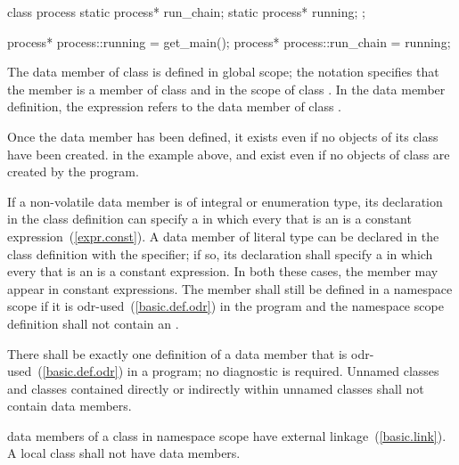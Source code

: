 \begin{codeblock}
class process {
  static process* run_chain;
  static process* running;
};

process* process::running = get_main();
process* process::run_chain = running;
\end{codeblock}

The  data member  of class
 is defined in global scope; the notation
 specifies that the member 
is a member of class  and in the scope of class
. In the  data member definition, the
 expression refers to the  data
member  of class .
\exitexample

\enternote
Once the  data member has been defined, it exists even if
no objects of its class have been created.
\enterexample
in the example above,  and  exist even
if no objects of class  are created by the program.
\exitexample
\exitnote

\pnum
If a non-volatile   data member is
of integral or enumeration type,
its declaration in the class definition can specify a
 in which every
 that is an 
is a constant expression~(\ref{expr.const}). A  data member of
literal type can be declared in the class definition with the
 specifier; if so, its declaration shall specify a
 in which every
 that is an 
is a constant expression. \enternote In both these cases,
the member may appear in constant expressions. \exitnote The
member shall still be defined in a namespace scope if
it is odr-used~(\ref{basic.def.odr}) in the program and the
namespace scope definition shall not contain an .

\pnum
\enternote
There shall be exactly one definition of a  data member
that is odr-used~(\ref{basic.def.odr}) in a program; no diagnostic is required.
\exitnote
Unnamed classes and classes contained directly
or indirectly within unnamed classes shall not contain 
data members.

\pnum
{}%
 data members of a class in namespace scope have external
linkage~(\ref{basic.link}). A local class shall not have 
data members.

